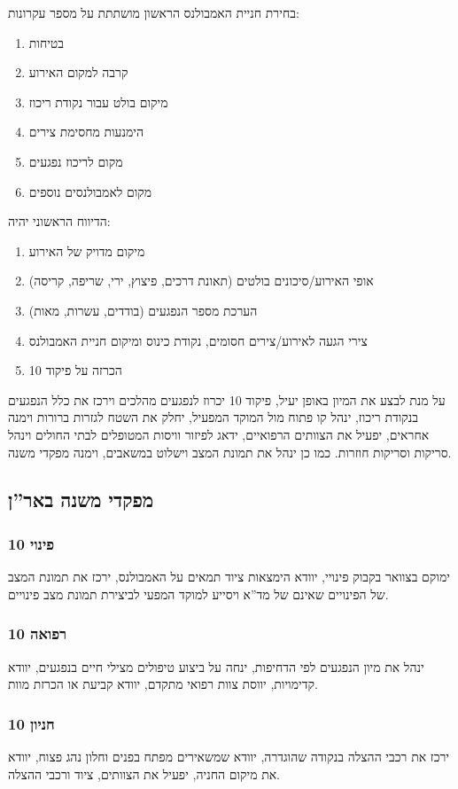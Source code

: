 \documentclass{article}
\begin{document}
בחירת חניית האמבולנס הראשון מושתתת על מספר עקרונות:
\begin{enumerate}
    \item בטיחות
    \item קרבה למקום האירוע
    \item מיקום בולט עבור נקודת ריכוז
    \item הימנעות מחסימת צירים
    \item מקום לריכוז נפגעים
    \item מקום לאמבולנסים נוספים
\end{enumerate}
הדיווח הראשוני יהיה:
\begin{enumerate}
    \item מיקום מדויק של האירוע
    \item אופי האירוע/סיכונים בולטים (תאונת דרכים, פיצוץ, ירי, שריפה, קריסה)
    \item הערכת מספר הנפגעים (בודדים, עשרות, מאות)
    \item צירי הגעה לאירוע/צירים חסומים, נקודת כינוס ומיקום חניית האמבולנס
    \item הכרזה על פיקוד 10
\end{enumerate}

על מנת לבצע את המיון באופן יעיל, פיקוד 10 יכרוז לנפגעים מהלכים וירכז את כלל הנפגעים בנקודת ריכוז, ינהל קו פתוח מול המוקד המפעיל, יחלק את השטח לגזרות ברורות וימנה אחראים, יפעיל את הצוותים הרפואיים, ידאג לפיזור וויסות המטופלים לבתי החולים וינהל סריקות וסריקות חוזרות. כמו כן ינהל את תמונת המצב וישלוט במשאבים, וימנה מפקדי משנה.

\subsection{מפקדי משנה באר''ן}
\subsubsection{פינוי 10}
ימוקם בצוואר בקבוק פינויי, יוודא הימצאות ציוד תמאים על האמבולנס, ירכז את תמונת המצב של הפינויים שאינם של מד''א ויסייע למוקד המפעי לביצירת תמונת מצב פינויים.
\subsubsection{רפואה 10}
ינהל את מיון הנפגעים לפי הדחיפות, ינחה על ביצוע טיפולים מצילי חיים בנפגעים, יוודא קדימויות, יווסת צוות רפואי מתקדם, יוודא קביעת או הכרזת מוות.
\subsubsection{חניון 10}
ירכז את רכבי ההצלה בנקודה שהוגדרה, יוודא שמשאירים מפתח בפנים וחלון נהג פצוח, יוודא את מיקום החניה, יפעיל את הצוותים, ציוד ורכבי ההצלה.
\end{document}
